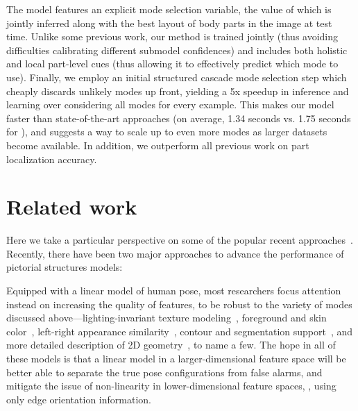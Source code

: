 The model features an explicit mode selection variable, the value of which is 
jointly inferred along with the best layout of body parts in the image at test 
time.  Unlike some previous work, our method is trained jointly (thus avoiding 
difficulties calibrating different submodel confidences) and includes both 
holistic and local part-level cues (thus allowing it to effectively predict 
which mode to use).  Finally, we employ an initial structured cascade mode 
selection step which cheaply discards unlikely modes up front, yielding a 5x 
speedup in inference and learning over considering all modes for every example.  
This makes our model faster than state-of-the-art approaches (on average, 1.34 
seconds vs. 1.75 seconds for \citet{deva2011}), and suggests a way to scale up 
to even more modes as larger datasets become available.  In addition, we 
outperform all previous work on part localization accuracy.  
 

\section{Related work}\label{sec:llps-rel}
Here we take a particular perspective on some of the popular recent 
approaches~\citet{devacrf,eichner09,sapp2010cascades,sapp2011,andriluka09,ddtran}.  
Recently, there have been two major approaches to advance the performance of 
pictorial structures models:

  Equipped with a linear model of 
human pose, most researchers focus attention instead on increasing the quality 
of features, to be robust to the variety of modes discussed 
above---lighting-invariant texture modeling~\citep{andriluka09}, foreground and 
skin color~\citep{devacrf,eichner09}, left-right appearance 
similarity~\citep{ddtran,sapp2011}, contour and segmentation 
support~\citep{sapp2010cascades,sapp2011}, and more detailed description of 2D 
geometry~\citep{ddtran,sapp2011}, to name a few.  The hope in all of these 
models is that a linear model in a larger-dimensional feature space will be 
better able to separate the true pose configurations from false alarms, and 
mitigate the issue of non-linearity in lower-dimensional feature spaces, \eg, 
using only edge orientation information.

